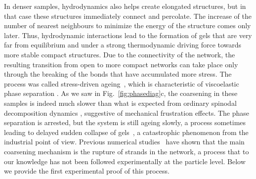 \documentclass[footinbib,amsmath,amssymb,superscriptaddress,twocolumn]{revtex4}
\begin{document}
In denser samples, hydrodynamics also helps create elongated structures, but in that case these structures immediately connect and percolate. The increase of the number of
nearest neighbours to minimize the energy of the structure comes only later.
Thus, hydrodynamic interactions lead to the formation of gels that are very far from equilibrium and under a strong thermodynamic driving force 
towards more stable compact structures. 
Due to the connectivity of the network, the resulting transition from open to more compact networks can take place only through
the breaking of the bonds that have accumulated more stress. The process was called stress-driven ageing~\cite{Tanaka2007}, 
which is characteristic of viscoelastic phase separation \cite{tanaka2000viscoelastic}. 
As we saw in Fig.~\ref{fig:phasediag}c, the coarsening in these samples is indeed much slower than what is expected from ordinary spinodal decomposition dynamics \cite{onuki2002phase}, 
suggestive of mechanical frustration effects. The phase separation is arrested, but the system is still ageing slowly, a process sometimes leading to delayed sudden collapse of gels~\cite{poon1999delayed,Bartlett2012}, a catastrophic phenomenon from the industrial point of view. Previous numerical studies~\cite{Tanaka2007,colombo2014self,testard2014intermittent} have shown that the main coarsening mechanism is the rupture of strands in the network, a process that to our knowledge has not been followed experimentally at the particle level.
Below we provide the first experimental proof of this process. 
\end{document}

